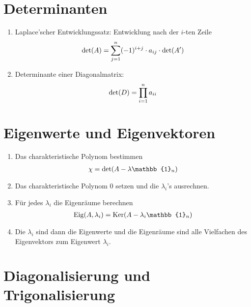 \documentclass[ngerman,a4paper]{article}
\DeclareMathOperator{\Eig}{Eig}
\DeclareMathOperator{\Ker}{Ker}
\begin{document}
\section{Determinanten}
\begin{enumerate}[label=\textbf{\arabic*.}]
	\item Laplace'scher Entwicklungssatz: Entwicklung nach der $i$-ten Zeile
	\begin{align}
		\det(A) = \sum_{j=1}^n (-1)^{i+j}\cdot a_{ij}\cdot\det(A')\notag
	\end{align}
	\item Determinante einer Diagonalmatrix:
	\begin{align}
		\det(D) = \prod_{i=1}^n a_{ii}\notag
	\end{align}
\end{enumerate}

\section{Eigenwerte und Eigenvektoren}
\begin{enumerate}[label=\textbf{\arabic*.}]
	\item Das charakteristische Polynom bestimmen
	\begin{align}
		\chi = \det(A-\lambda\mathbb{1}_n)\notag
	\end{align}
	\item Das charakteristische Polynom 0 setzen und die $\lambda_i$'s ausrechnen.
	\item Für jedes $\lambda_i$ die Eigenräume berechnen
	\begin{align}
		\Eig(A,\lambda_i) = \Ker(A-\lambda_i\mathbb{1}_n)\notag
	\end{align}
	\item Die $\lambda_i$ sind dann die Eigenwerte und die Eigenräume sind alle Vielfachen des Eigenvektors zum Eigenwert $\lambda_i$.
\end{enumerate}

\section{Diagonalisierung und Trigonalisierung}
\end{document}
